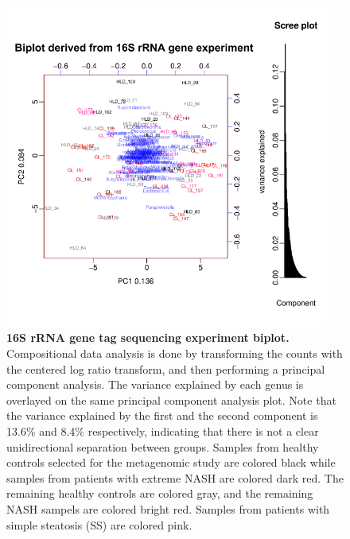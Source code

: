 \begin{figure}[h]
\begin{center}
\includegraphics[width=0.95\textwidth]{nafld_16s_biplot.png}
\caption[16S rRNA gene tag sequencing experiment biplot.]{\textbf{16S rRNA gene tag sequencing experiment biplot.} Compositional data analysis is done by transforming the counts with the centered log ratio transform, and then performing a principal component analysis. The variance explained by each genus is overlayed on the same principal component analysis plot. Note that the variance explained by the first and the second component is 13.6\% and 8.4\% respectively, indicating that there is not a clear unidirectional separation between groups. Samples from healthy controls selected for the metagenomic study are colored black while samples from patients with extreme NASH are colored dark red. The remaining healthy controls are colored gray, and the remaining NASH sampels are colored bright red. Samples from patients with simple steatosis (SS) are colored pink.}
\label{nafld_16s_biplot}
\end{center}
\end{figure}

